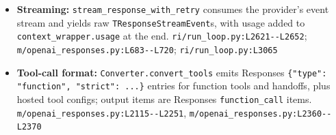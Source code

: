 \begin{itemize}
\item \textbf{Streaming:} \texttt{stream\_\allowbreak{}response\_\allowbreak{}with\_\allowbreak{}retry} consumes the provider's event stream and yields raw \texttt{TResponseStreamEvent}s, with usage added to \texttt{context\_\allowbreak{}wrapper.\allowbreak{}usage} at the end. \texttt{ri/\allowbreak{}run\_\allowbreak{}loop.\allowbreak{}py:\allowbreak{}L2621-\allowbreak{}-\allowbreak{}L2652}; \texttt{m/\allowbreak{}openai\_\allowbreak{}responses.\allowbreak{}py:\allowbreak{}L683-\allowbreak{}-\allowbreak{}L720}; \texttt{ri/\allowbreak{}run\_\allowbreak{}loop.\allowbreak{}py:\allowbreak{}L3065}
\item \textbf{Tool-call format:} \texttt{Converter.\allowbreak{}convert\_\allowbreak{}tools} emits Responses \texttt{\{"type":\allowbreak{} "function", "strict":\allowbreak{} .\allowbreak{}.\allowbreak{}.\allowbreak{}\}} entries for function tools and handoffs, plus hosted tool configs; output items are Responses \texttt{function\_\allowbreak{}call} items. \texttt{m/\allowbreak{}openai\_\allowbreak{}responses.\allowbreak{}py:\allowbreak{}L2115-\allowbreak{}-\allowbreak{}L2251}, \texttt{m/\allowbreak{}openai\_\allowbreak{}responses.\allowbreak{}py:\allowbreak{}L2360-\allowbreak{}-\allowbreak{}L2370}
\end{itemize}

